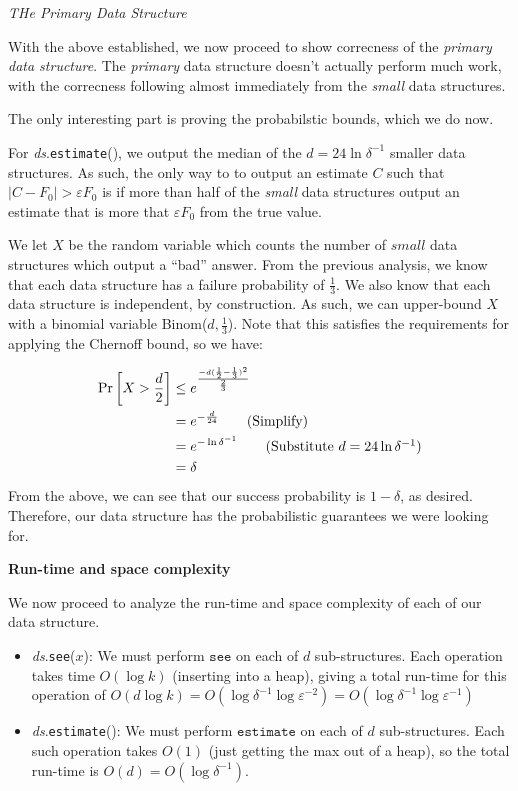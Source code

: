 \documentclass[12pt]{exam}
\newcommand*{\bigo}[1]{O \left( #1 \right)}
\newcommand*{\prob}[1]{\text{Pr} \left[ #1 \right]}
\newcommand*{\eps}{\varepsilon}  %
\begin{document}
\begin{questions}
\begin{parts}
\begin{solution}
\textit{THe Primary Data Structure}

With the above established, we now proceed to show correcness of the \textit{primary data structure}. The \textit{primary} data structure doesn't actually perform much work, with the correcness following almost immediately from the \textit{small} data structures.

The only interesting part is proving the probabilstic bounds, which we do now.

For \textit{ds}.\texttt{estimate}(), we output the median of the $d = 24\ln \delta^{-1}$ smaller data structures. As such, the only way to to output an estimate $C$ such that $|C - F_0| > \eps F_0$ is if more than half of the \textit{small} data structures output an estimate that is more that $\eps F_0$ from the true value.

We let $X$ be the random variable which counts the number of $\textit{small}$ data structures which output a ``bad'' answer. From the previous analysis, we know that each data structure has a failure probability of $\frac{1}{3}$. We also know that each data structure is independent, by construction. As such, we can upper-bound $X$ with a binomial variable Binom($d, \frac{1}{3}$). Note that this satisfies the requirements for applying the Chernoff bound, so we have:

\begin{align*}
  \prob{X > \frac{d}{2}} &\leq e^{\frac{-d(\frac{1}{2} - \frac{1}{3})^2}{\frac{2}{3}}} \\
  &= e^{-\frac{d}{24}} \tag{Simplify}  \\
  &= e^{-\ln \delta^{-1}} \tag{Substitute $d = 24 \ln \delta^{-1}$}\\
  &= \delta
\end{align*}
From the above, we can see that our success probability is $1 - \delta$, as desired. Therefore, our data structure has the probabilistic guarantees we were looking for.


\textbf{Run-time and space complexity}

We now proceed to analyze the run-time and space complexity of each of our data structure.


\begin{itemize}
  \item \textit{ds}.\texttt{see}($x$): We must perform $\texttt{see}$ on each of $d$ sub-structures. Each operation takes time $\bigo{\log k}$ (inserting into a heap), giving a total run-time for this operation of $\bigo{d \log k} = \bigo{\log \delta^{-1} \log \eps^{-2} } = \bigo{\log \delta^{-1} \log \eps^{-1} }$
  \item \textit{ds}.\texttt{estimate}(): We must perform $\texttt{estimate}$ on each of $d$ sub-structures. Each such operation takes $\bigo{1}$ (just getting the max out of a heap), so the total run-time is $\bigo{d} = \bigo{\log \delta^{-1}}$.
\end{itemize}


\end{solution}
\end{parts}
\end{questions}
\end{document}
